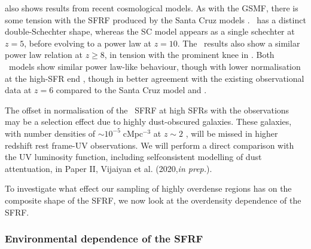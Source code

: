  also shows results from recent cosmological models.
As with the GSMF, there is some tension with the SFRF produced by the Santa Cruz models \citep{yung_semi-analytic_2019}.
\flares\ has a distinct double-Schechter shape, whereas the SC model appears as a single schechter at $z = 5$, before evolving to a power law at $z = 10$.
The \bluetides\ results \citep{wilkins_properties_2017} also show a similar power law relation at $z \geqslant 8$, in tension with the prominent knee in \flares.
Both \lgals\ models show similar power law-like behaviour, though with lower normalisation at the high-SFR end \citep{henriques_galaxy_2015,henriques_l-galaxies_2020}, though in better agreement with the existing observational data at $z = 6$ compared to the Santa Cruz model and \flares.

The offset in normalisation of the \flares\ SFRF at high SFRs with the observations may be a selection effect due to highly dust-obscured galaxies.
These galaxies, with number densities of $\sim 10^{-5} \; \mathrm{cMpc^{-3}}$  at $z \sim 2$ \citep{simpson_alma_2014}, will be missed in higher redshift rest frame-UV observations.
We will perform a direct comparison with the UV luminosity function, including selfconsistent modelling of dust attentuation, in Paper II, Vijaiyan et al. (2020,\textit{in prep.}).

To investigate what effect our sampling of highly overdense regions has on the composite shape of the SFRF, we now look at the overdensity dependence of the SFRF.


\subsubsection{Environmental dependence of the SFRF}
\label{sec:env_sfrf}

